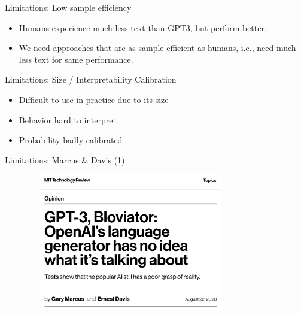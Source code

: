 
\begin{frame}{Limitations: Low sample efficiency}

\vfill

  \begin{itemize}
    \item Humans experience much less text than GPT3, but
perform better.
    \item We  need approaches that are as
    sample-efficient as humans, i.e., need much less text
    for same performance.

    \end{itemize}

\vfill

\end{frame}


\begin{frame}{Limitations: Size / Interpretability Calibration}

\vfill

  \begin{itemize}
\item Difficult to use in practice due to its size
    \item Behavior hard to interpret
    \item Probability badly calibrated
    \end{itemize}

\vfill

\end{frame}



\begin{frame}{Limitations: Marcus \& Davis (1)}

\vfill

	\begin{figure}
		\centering
		\includegraphics[height=6cm,width=9cm]{figure/marcusmittechreview.png}
	\end{figure}

\vfill

\end{frame}

